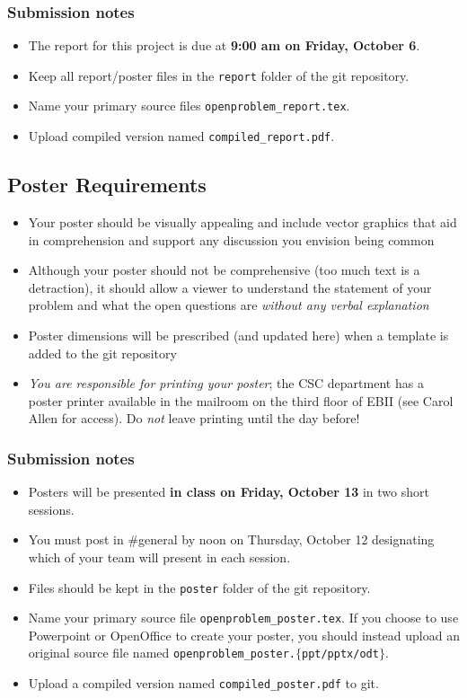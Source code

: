 \documentclass{article}
\begin{document}
\subsubsection*{Submission notes}
\begin{itemize}
\item The report for this project is due at \textbf{9:00 am on Friday, October 6}.
\item Keep all report/poster files in the \texttt{report} folder of the git repository.
\item Name your primary source files \texttt{openproblem\_report.tex}.
\item Upload compiled version named \texttt{compiled\_report.pdf}.

\end{itemize}

\newpage

\subsection*{Poster Requirements}

\begin{itemize}
    \item Your poster should be visually appealing and include
    vector graphics that aid in comprehension and support any
    discussion you envision being common
    \item Although your poster should not be comprehensive (too much
    text is a detraction), it should allow a viewer to understand the
    statement of your problem and what
    the open questions are \emph{without any verbal explanation}
    \item Poster dimensions will be prescribed (and updated here) when
    a template is added to the git repository
    \item \emph{You are responsible for printing your poster}; the CSC department
    has a poster printer available in the mailroom on the third floor of EBII
    (see Carol Allen for access). Do \emph{not} leave printing until the day before!
\end{itemize}

\subsubsection*{Submission notes}
\begin{itemize}
\item Posters will be presented \textbf{in class on Friday, October 13} in two short sessions.
\item You must post in \#general by noon on Thursday, October 12 designating which of
your team will present in each session.
\item Files should be kept in the \texttt{poster} folder of the git repository.
\item Name your primary source file \texttt{openproblem\_poster.tex}.
If you choose to use Powerpoint or OpenOffice to create your poster, you should
instead upload an original source file named
\texttt{openproblem\_poster.}$\{$\texttt{ppt/pptx/odt}$\}$.
\item Upload a compiled version named \texttt{compiled\_poster.pdf} to git.
\end{itemize}
\end{document}
